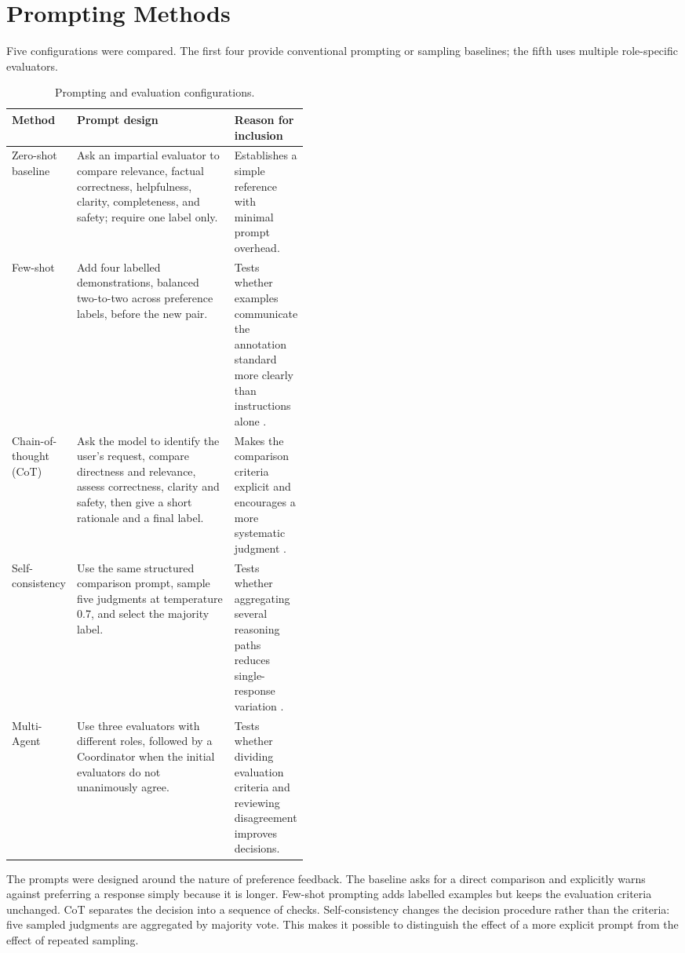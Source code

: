 \documentclass[10pt]{article}
\begin{document}
\section{Prompting Methods}
Five configurations were compared. The first four provide conventional prompting or sampling baselines; the fifth uses multiple role-specific evaluators.

\begin{table}[ht]
\centering
\small
\begin{tabularx}{\linewidth}{@{}p{0.19\linewidth}X p{0.25\linewidth}@{}}
\toprule
Method & Prompt design & Reason for inclusion \\
\midrule
Zero-shot baseline & Ask an impartial evaluator to compare relevance, factual correctness, helpfulness, clarity, completeness, and safety; require one label only. & Establishes a simple reference with minimal prompt overhead. \\
Few-shot & Add four labelled demonstrations, balanced two-to-two across preference labels, before the new pair. & Tests whether examples communicate the annotation standard more clearly than instructions alone \cite{brown2020}. \\
Chain-of-thought (CoT) & Ask the model to identify the user's request, compare directness and relevance, assess correctness, clarity and safety, then give a short rationale and a final label. & Makes the comparison criteria explicit and encourages a more systematic judgment \cite{wei2022}. \\
Self-consistency & Use the same structured comparison prompt, sample five judgments at temperature 0.7, and select the majority label. & Tests whether aggregating several reasoning paths reduces single-response variation \cite{wang2023}. \\
Multi-Agent & Use three evaluators with different roles, followed by a Coordinator when the initial evaluators do not unanimously agree. & Tests whether dividing evaluation criteria and reviewing disagreement improves decisions. \\
\bottomrule
\end{tabularx}
\caption{Prompting and evaluation configurations.}
\end{table}

The prompts were designed around the nature of preference feedback. The baseline asks for a direct comparison and explicitly warns against preferring a response simply because it is longer. Few-shot prompting adds labelled examples but keeps the evaluation criteria unchanged. CoT separates the decision into a sequence of checks. Self-consistency changes the decision procedure rather than the criteria: five sampled judgments are aggregated by majority vote. This makes it possible to distinguish the effect of a more explicit prompt from the effect of repeated sampling.
\end{document}

